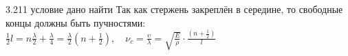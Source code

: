 \testCom
{%
	3.211
}
{%
	условие
}
{%
	дано
}
{%
	найти
}
{%
	Так как стержень закреплён в середине, то свободные концы должны быть пучностями:\\
	$\frac{1}{2} l = n \frac{\lambda}{2} + \frac{\lambda}{4} = \frac{\lambda}{2} (n + \frac{1}{2}), \quad \nu_c = \frac{\upsilon}{\lambda} = \sqrt{\frac{E}{\rho}} \cdot \frac{(n + \frac{1}{2})}{l}$\\
}

